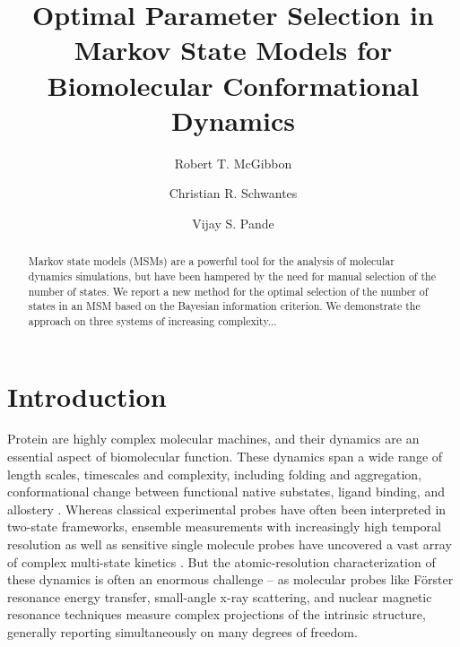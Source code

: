 \documentclass[twocolumn,floatfix,nofootinbib,aps]{revtex4-1}
\begin{document}
\title{Optimal Parameter Selection in Markov State Models for Biomolecular Conformational Dynamics}
\author{Robert T. McGibbon}
\author{Christian R. Schwantes}
\author{Vijay S. Pande}

\begin{abstract}
Markov state models (MSMs) are a powerful tool for the analysis of molecular dynamics simulations, but have been hampered by the need for manual selection of the number of states. We report a new method for the optimal selection of the number of states in an MSM based on the Bayesian information criterion. We demonstrate the approach on three systems of increasing complexity...
\end{abstract}

\maketitle

\section{Introduction}
Protein are highly complex molecular machines, and their dynamics are an essential aspect of biomolecular function. These dynamics span a wide range of length scales, timescales and complexity, including folding and aggregation, conformational change between functional native substates, ligand binding, and allostery \cite{Dobson2003Protein, Kim2008Real, Austin1975Dynamics, Bahar2007Intrinsic}. Whereas classical experimental probes have often been interpreted in two-state frameworks, ensemble measurements with increasingly high temporal resolution as well as sensitive single molecule probes have uncovered a vast array of complex multi-state kinetics \cite{Cosa2006Evidence, Zhang2011Direct}. But the atomic-resolution characterization of these dynamics is often an enormous challenge -- as molecular probes like F\"{o}rster resonance energy transfer, small-angle x-ray scattering, and nuclear magnetic resonance techniques measure complex projections of the intrinsic structure, generally reporting simultaneously on many degrees of freedom\cite{Mertens2010Structural, Tzeng2011Protein}.
\end{document}
